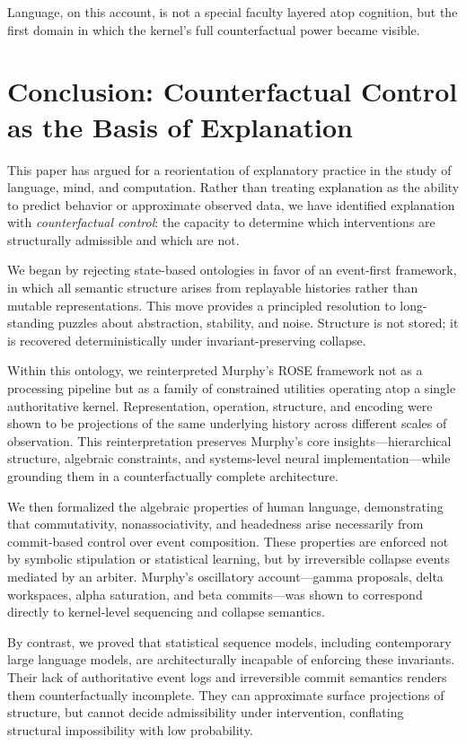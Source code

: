 \documentclass[11pt]{article}
\begin{document}
Language, on this account, is not a special faculty layered atop cognition, but the first domain in which the kernel’s full counterfactual power became visible.

\section{Conclusion: Counterfactual Control as the Basis of Explanation}
\label{sec:conclusion}

This paper has argued for a reorientation of explanatory practice in the study of language, mind, and computation. Rather than treating explanation as the ability to predict behavior or approximate observed data, we have identified explanation with \emph{counterfactual control}: the capacity to determine which interventions are structurally admissible and which are not.

We began by rejecting state-based ontologies in favor of an event-first framework, in which all semantic structure arises from replayable histories rather than mutable representations. This move provides a principled resolution to long-standing puzzles about abstraction, stability, and noise. Structure is not stored; it is recovered deterministically under invariant-preserving collapse.

Within this ontology, we reinterpreted Murphy’s ROSE framework not as a processing pipeline but as a family of constrained utilities operating atop a single authoritative kernel. Representation, operation, structure, and encoding were shown to be projections of the same underlying history across different scales of observation. This reinterpretation preserves Murphy’s core insights—hierarchical structure, algebraic constraints, and systems-level neural implementation—while grounding them in a counterfactually complete architecture.

We then formalized the algebraic properties of human language, demonstrating that commutativity, nonassociativity, and headedness arise necessarily from commit-based control over event composition. These properties are enforced not by symbolic stipulation or statistical learning, but by irreversible collapse events mediated by an arbiter. Murphy’s oscillatory account—gamma proposals, delta workspaces, alpha saturation, and beta commits—was shown to correspond directly to kernel-level sequencing and collapse semantics.

By contrast, we proved that statistical sequence models, including contemporary large language models, are architecturally incapable of enforcing these invariants. Their lack of authoritative event logs and irreversible commit semantics renders them counterfactually incomplete. They can approximate surface projections of structure, but cannot decide admissibility under intervention, conflating structural impossibility with low probability.
\end{document}
